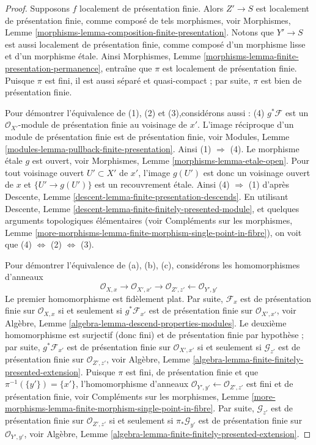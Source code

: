 \begin{proof}
Supposons $f$ localement de présentation finie. Alors $Z' \to S$ est localement
de présentation finie, comme composé de tels morphismes, voir
Morphismes, Lemme \ref{morphisms-lemma-composition-finite-presentation}.
Notons que $Y' \to S$ est aussi localement de présentation finie, comme composé
d'un morphisme lisse et d'un morphisme \'etale. Ainsi
Morphismes, Lemme \ref{morphisms-lemma-finite-presentation-permanence},
entraîne que $\pi$ est localement de présentation finie.
Puisque $\pi$ est fini, il est aussi séparé et
quasi-compact ; par suite, $\pi$ est bien de présentation finie.

\medskip\noindent
Pour démontrer l'équivalence de (1), (2) et (3),\newline considérons aussi :
(4) $g^*\mathcal{F}$ est un $\mathcal{O}_{X'}$-module de présentation finie
au voisinage de $x'$. L'image réciproque d'un module de présentation finie
est de présentation finie, voir
Modules, Lemme \ref{modules-lemma-pullback-finite-presentation}.
Ainsi (1) $\Rightarrow$ (4).
Le morphisme \'etale $g$ est ouvert, voir
Morphismes, Lemme \ref{morphisms-lemma-etale-open}.
Pour tout voisinage ouvert $U' \subset X'$ de $x'$, l'image
$g(U')$ est donc un voisinage ouvert de $x$ et
$\{U' \to g(U')\}$ est un recouvrement \'etale. Ainsi (4) $\Rightarrow$ (1) d'après
Descente, Lemme \ref{descent-lemma-finite-presentation-descends}.
En utilisant
Descente, Lemme \ref{descent-lemma-finite-finitely-presented-module},
et quelques arguments topologiques élémentaires (voir
Compléments sur les morphismes,
Lemme \ref{more-morphisms-lemma-finite-morphism-single-point-in-fibre}),
on voit que
(4) $\Leftrightarrow$ (2) $\Leftrightarrow$ (3).

\medskip\noindent
Pour démontrer l'équivalence de (a), (b), (c), considérons les homomorphismes d'anneaux
$$
\mathcal{O}_{X, x} \to
\mathcal{O}_{X', x'} \to
\mathcal{O}_{Z', z'} \leftarrow
\mathcal{O}_{Y', y'}
$$
Le premier homomorphisme est fidèlement plat. Par suite,
$\mathcal{F}_x$ est de présentation finie sur $\mathcal{O}_{X, x}$
si et seulement si $g^*\mathcal{F}_{x'}$ est de présentation finie sur
$\mathcal{O}_{X', x'}$, voir
Algèbre, Lemme \ref{algebra-lemma-descend-properties-modules}.
Le deuxième homomorphisme est surjectif (donc fini) et
de présentation finie par hypothèse ; par suite,
$g^*\mathcal{F}_{x'}$ est de présentation finie sur $\mathcal{O}_{X', x'}$
si et seulement si $\mathcal{G}_{z'}$ est de présentation finie sur
$\mathcal{O}_{Z', z'}$, voir
Algèbre, Lemme \ref{algebra-lemma-finite-finitely-presented-extension}.
Puisque $\pi$ est fini, de présentation finie et que
$\pi^{-1}(\{y'\}) = \{x'\}$, l'homomorphisme d'anneaux
$\mathcal{O}_{Y', y'} \leftarrow \mathcal{O}_{Z', z'}$ est fini
et de présentation finie, voir
Compléments sur les morphismes,
Lemme \ref{more-morphisms-lemma-finite-morphism-single-point-in-fibre}.
Par suite, $\mathcal{G}_{z'}$ est de présentation finie sur $\mathcal{O}_{Z', z'}$
si et seulement si $\pi_*\mathcal{G}_{y'}$ est de présentation finie sur
$\mathcal{O}_{Y', y'}$, voir
Algèbre, Lemme \ref{algebra-lemma-finite-finitely-presented-extension}.
\end{proof}

